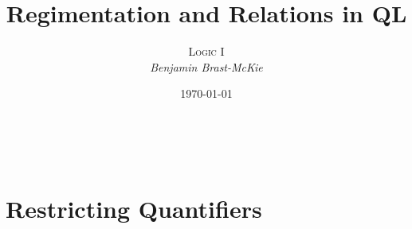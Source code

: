 \documentclass[a4paper, 11pt]{article} %
\title{\textbf{Regimentation and Relations in QL}} %
\author{\textsc{Logic I}\\ \em Benjamin Brast-McKie} %
\date{\today} %
\makeatletter
\def\therefore{\ensuremath{\ldotp\dot{}\,\ldotp}}
\renewcommand{\maketitle}{ %
\begin{flushright} %
{\LARGE\@title} %

\vspace{10pt} %

{\@author} %
\\\@date %

\vspace{15pt} %
\end{flushright}
}
\makeatother
\begin{document}
\maketitle %

\thispagestyle{empty}


%
%
%
%
%

\section*{Restricting Quantifiers}
\end{document}
